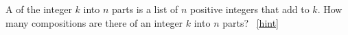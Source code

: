 \documentclass{book}
\begin{document}
\setcounter{project}{128}
\addtocounter{project}{-1}
\begin{activity}[]\label{compositionagian}
\hypertarget{p-914}{}%
A  of the integer \(k\) into \(n\) parts is a list of \(n\) positive integers that add to \(k\).  How many compositions are there of an integer \(k\) into \(n\) parts?%
~\hfill{\tiny\hyperlink{a-128}{[hint]}\hypertarget{q-128}{}}\end{activity}
\end{document}

